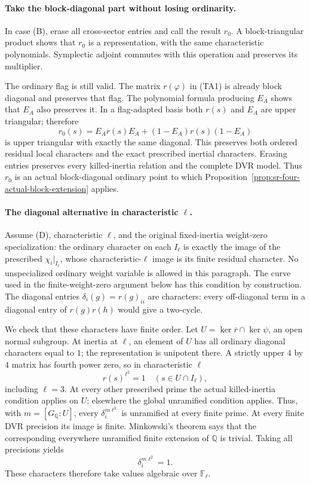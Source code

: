 \paragraph{Take the block-diagonal part without losing ordinarity.}
In case (B), erase all cross-sector entries and call the result
\(r_0\). A block-triangular product shows that \(r_0\) is a
representation, with the same characteristic polynomials.
Symplectic adjoint commutes with this operation and preserves
its multiplier.

The ordinary flag is still valid.
The matrix \(r(\varphi)\) in (TA1) is already block diagonal
and preserves that flag. The polynomial formula producing
\(E_A\) shows that \(E_A\) also preserves it.
In a flag-adapted basis both \(r(s)\) and \(E_A\) are upper
triangular; therefore
\[
             r_0(s)=E_A r(s)E_A+(1-E_A)r(s)(1-E_A)
\]
is upper triangular with exactly the same diagonal.
This preserves both ordered residual local characters and
the exact prescribed inertial characters.
Erasing entries preserves every killed-inertia relation and
the complete DVR model.
Thus \(r_0\) is an actual block-diagonal ordinary point to
which Proposition~\ref{prop:sr-four-actual-block-extension}
applies.

\paragraph{The diagonal alternative in characteristic \(\ell\).}
Assume (D), characteristic \(\ell\), and the original
fixed-inertia weight-zero specialization:
the ordinary character on each \(I_\ell\) is exactly the
image of the prescribed \(\chi_i|_{I_\ell}\), whose
characteristic-\(\ell\) image is its finite residual character.
No unspecialized ordinary weight variable is allowed in this
paragraph. The curve used in the finite-weight-zero argument
below has this condition by construction.
The diagonal entries \(\delta_i(g)=r(g)_{ii}\) are characters:
every off-diagonal term in a diagonal entry of \(r(g)r(h)\)
would give a two-cycle.

We check that these characters have finite order.
Let \(U=\ker\bar r\cap\ker\psi\), an open normal subgroup.
At inertia at \(\ell\), an element of \(U\) has all ordinary
diagonal characters equal to \(1\); the representation is
unipotent there. A strictly upper \(4\) by \(4\) matrix has
fourth power zero, so in characteristic \(\ell\)
\[
                  r(s)^{\ell^2}=1
                   \quad(s\in U\cap I_\ell),             \tag{TA7}
\]
including \(\ell=3\).
At every other prescribed prime the actual killed-inertia
condition applies on \(U\); elsewhere the global unramified
condition applies.
Thus, with \(m=[G_{\mathbb Q}:U]\), every
\(\delta_i^{m\ell^2}\) is unramified at every finite prime.
At every finite DVR precision its image is finite.
Minkowski's theorem says that the corresponding everywhere
unramified finite extension of \(\mathbb Q\) is trivial.
Taking all precisions yields
\[
                         \delta_i^{m\ell^2}=1.            \tag{TA8}
\]
These characters therefore take values algebraic over
\(\mathbb F_\ell\).

